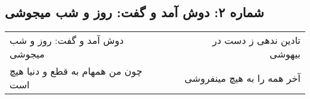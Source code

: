 \begin{center}
\section*{شماره ۲: دوش آمد و گفت: روز و شب میجوشی}
\label{sec:002}
\begin{longtable}{l p{0.5cm} r}
دوش آمد و گفت: روز و شب میجوشی
&&
تادین ندهی ز دست در بیهوشی
\\
چون من همهام به قطع و دنیا هیچ است
&&
آخر همه را به هیچ مینفروشی
\\
\end{longtable}
\end{center}
